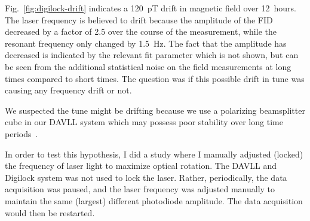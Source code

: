 Fig.~\ref{fig:digilock-drift} indicates a 120~pT drift in magnetic
field over 12~hours.  The laser frequency is believed to drift because
the amplitude of the FID decreased by a factor of 2.5 over the course
of the measurement, while the resonant frequency only changed by
1.5~Hz.  The fact that the amplitude has decreased is indicated by the
relevant fit parameter which is not shown, but can be seen from the
additional statistical noise on the field measurements at long times
compared to short times.  The question was if this possible drift in
tune was causing any frequency drift or not.

We suspected the tune might be drifting because we use a polarizing
beamsplitter cube in our DAVLL system which may possess poor stability over long time periods~\cite{bib:Philip2008}.

In order to test this hypothesis, I did a study where I manually
adjusted (locked) the frequency of laser light to maximize optical
rotation.  The DAVLL and Digilock system was not used to lock the
laser.  Rather, periodically, the data acquisition was paused, and the
laser frequency was adjusted manually to maintain the same (largest)
different photodiode amplitude. The data acquisition would then be
restarted.

